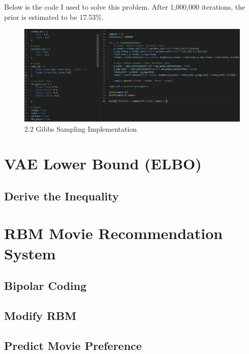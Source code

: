 \documentclass{article}
\begin{document}
Below is the code I used to solve this problem. After 1,000,000 iterations, the prior is estimated to be 17.53\%.

\begin{figure}[H]
    \centering
    \includegraphics[width=1\linewidth]{Q2 Code.png}
    \caption{2.2 Gibbs Sampling Implementation}
    \label{fig:enter-label}
\end{figure}

\section{VAE Lower Bound (ELBO)}
\subsection{Derive the Inequality}

\section{RBM Movie Recommendation System}
\subsection{Bipolar Coding}
\subsection{Modify RBM}
\subsection{Predict Movie Preference}
\end{document}
